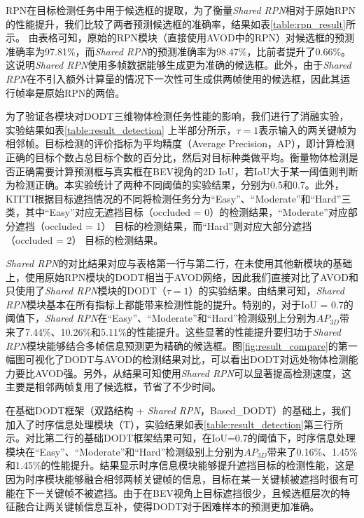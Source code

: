

RPN在目标检测任务中用于候选框的提取，为了衡量\textit{Shared RPN}相对于原始RPN的性能提升，我们比较了两者预测候选框的准确率，结果如表\ref{table:rpn_result}所示。
由表格可知，原始的RPN模块（直接使用AVOD\cite{ku2018joint}中的RPN）对候选框的预测准确率为97.81\%，而\textit{Shared RPN}的预测准确率为98.47\%，比前者提升了0.66\%。这说明\textit{Shared RPN}使用多帧数据能够生成更为准确的候选框。此外，由于\textit{Shared RPN}在不引入额外计算量的情况下一次性可生成供两帧使用的候选框，因此其运行帧率是原始RPN的两倍。



为了验证各模块对DODT三维物体检测任务性能的影响，我们进行了消融实验，实验结果如表\ref{table:result_detection} 上半部分所示，$\tau = 1$表示输入的两关键帧为相邻帧。目标检测的评价指标为平均精度（Average Precision，AP），即计算检测正确的目标个数占总目标个数的百分比，然后对目标种类做平均。衡量物体检测是否正确需要计算预测框与真实框在BEV视角的2D IoU，若IoU大于某一阈值则判断为检测正确。本实验统计了两种不同阈值的实验结果，分别为0.5和0.7。此外，KITTI根据目标遮挡情况的不同将检测任务分为“Easy”、“Moderate”和“Hard”三类，其中“Easy”对应无遮挡目标（occluded = 0）的检测结果，“Moderate”对应部分遮挡（occluded = 1） 目标的检测结果，而“Hard”则对应大部分遮挡（occluded = 2） 目标的检测结果。

\textit{Shared RPN}的对比结果对应与表格第一行与第二行，在未使用其他新模块的基础上，使用原始RPN模块的DODT相当于AVOD网络，因此我们直接对比了AVOD和只使用了\textit{Shared RPN}模块的DODT（$\tau = 1$）的实验结果。由结果可知，\textit{Shared RPN}模块基本在所有指标上都能带来检测性能的提升。特别的，对于IoU = 0.7的阈值下，\textit{Shared RPN}在“Easy”、“Moderate”和“Hard”检测级别上分别为$AP_{3D}$带来了7.44\%、10.26\%和5.11\%的性能提升。这些显著的性能提升要归功于\textit{Shared RPN}模块能够结合多帧信息预测更为精确的候选框。图\ref{fig:result_compare}的第一幅图可视化了DODT与AVOD的检测结果对比，可以看出DODT对远处物体检测能力要比AVOD强。另外，从结果可知使用\textit{Shared RPN}可以显著提高检测速度，这主要是相邻两帧复用了候选框，节省了不少时间。

在基础DODT框架（双路结构 + \textit{Shared RPN}，Based\_DODT）的基础上，我们加入了时序信息处理模块（T），实验结果如表\ref{table:result_detection}第三行所示。对比第二行的基础DODT框架结果可知，在IoU=0.7的阈值下，时序信息处理模块在“Easy”、“Moderate”和“Hard”检测级别上分别为$AP_{3D}$带来了0.16\%、1.45\%和1.45\%的性能提升。结果显示时序信息模块能够提升遮挡目标的检测性能，这是因为时序模块能够融合相邻两帧关键帧的信息，目标在某一关键帧被遮挡时很有可能在下一关键帧不被遮挡。由于在BEV视角上目标遮挡很少，且候选框层次的特征融合让两关键帧信息互补，使得DODT对于困难样本的预测更加准确。

